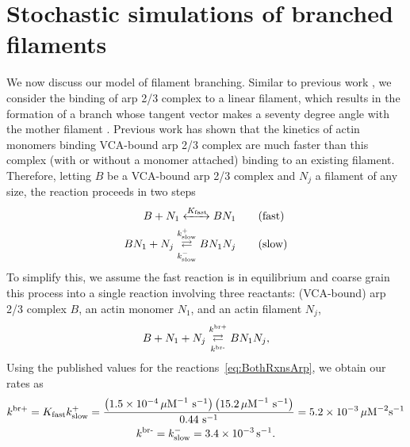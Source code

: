 \documentclass[11pt]{article}
\begin{document}
%

\section{Stochastic simulations of branched filaments \label{sec:BF}}
We now discuss our model of filament branching. Similar to previous work \cite{ni2019turnover}, we consider the binding of arp 2/3 complex to a linear filament, which results in the formation of a branch whose tangent vector makes a seventy degree angle with the mother filament \cite{pollard2007regulation}. Previous work \cite{beltzner2008pathway} has shown that the kinetics of actin monomers binding VCA-bound arp 2/3 complex are much faster than this complex (with or without a monomer attached) binding to an existing filament. Therefore, letting $B$ be a VCA-bound arp 2/3 complex and $N_j$ a filament of any size, the reaction proceeds in two steps
\begin{subequations}
\label{eq:BothRxnsArp}
\begin{align}
\label{eq:fastrxn}
B + N_1 \xleftrightarrow{K_\text{fast}} BN_1 \qquad & \text{(fast)}\\
BN_1 + N_j \overset{k_\text{slow}^+}{\underset{k_\text{slow}^-}\rightleftarrows} BN_1N_j \qquad & \text{(slow)}
\end{align}
\end{subequations}
To simplify this, we assume the fast reaction is in equilibrium and coarse grain this process into a single reaction involving three reactants: (VCA-bound) arp 2/3 complex $B$, an actin monomer $N_1$, and an actin filament $N_j$, 
\begin{equation}
\label{eq:ArpRxn}
B + N_1 + N_j \overset{k^\text{br+}}{\underset{k^\text{br-}}\rightleftarrows} BN_1N_j,
\end{equation}
Using the published values \cite{beltzner2008pathway} for the reactions\ \eqref{eq:BothRxnsArp}, we obtain our rates as 
\begin{gather*}
k^\text{br+} = K_\text{fast} k_\text{slow}^+=\frac{\left(1.5 \times 10^{-4} \, \mu\text{M}^{-1}\text{ s}^{-1}\right)\left(15.2 \, \mu\text{M}^{-1}\text{ s}^{-1}\right)}{0.44 \text{ s}^{-1}}=5.2 \times 10^{-3} \, \mu\text{M}^{-2}\text{s}^{-1}\\
k^\text{br-} = k_\text{slow}^- = 3.4 \times 10^{-3} \, \text{s}^{-1}.
\end{gather*}
\end{document}
